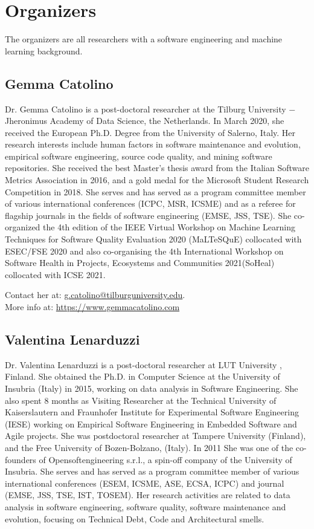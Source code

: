 
\section{Organizers}

The organizers are all researchers with a software engineering and machine learning background.

\label{sec:organizers}
\subsection{Gemma Catolino}
Dr. Gemma Catolino is a post-doctoral researcher at the Tilburg University $-$ Jheronimus Academy of Data Science, the Netherlands.
In March 2020, she received the European Ph.D. Degree from the University of Salerno, Italy. Her research interests include human factors in software maintenance and evolution, empirical software engineering, source code quality, and mining software repositories.
She received the best Master's thesis award from the Italian Software Metrics Association in 2016, and a gold medal for the Microsoft Student Research Competition in 2018. She serves and has served as a program committee member of various international conferences (ICPC, MSR, ICSME) and as a referee for flagship journals in the fields of software engineering (EMSE, JSS, TSE). She co-organized the 4th edition of the IEEE Virtual Workshop on Machine Learning Techniques for Software Quality Evaluation 2020 (MaLTeSQuE) collocated with ESEC/FSE 2020 and also co-organising the 4th International Workshop on Software Health in Projects, Ecosystems and Communities 2021(SoHeal) collocated with ICSE 2021.

\medskip
\noindent Contact her at: \href{mailto:g.catolino@tilburguniversity.edu}{g.catolino@tilburguniversity.edu}.\\
More info at: \url{https://www.gemmacatolino.com}

\subsection{Valentina Lenarduzzi}
Dr. Valentina Lenarduzzi is a post-doctoral researcher at LUT University , Finland. 
She obtained the Ph.D. in Computer Science at the University of Insubria (Italy) in 2015, working on data analysis in Software Engineering. She also spent 8 months as Visiting Researcher at the Technical University of Kaiserslautern and Fraunhofer Institute for Experimental Software Engineering (IESE) working on Empirical Software Engineering in Embedded Software and Agile projects.
She was postdoctoral researcher at Tampere University (Finland), and the Free University of Bozen-Bolzano, (Italy). In 2011 She was one of the co-founders of Opensoftengineering s.r.l., a spin-off company of the University of Insubria. She serves and has served as a program committee member of various international conferences (ESEM, ICSME, ASE, ECSA, ICPC) and journal (EMSE, JSS, TSE, IST, TOSEM).
Her research activities are related to data analysis in software engineering, software quality, software maintenance and evolution, focusing on Technical Debt, Code and Architectural smells. 

